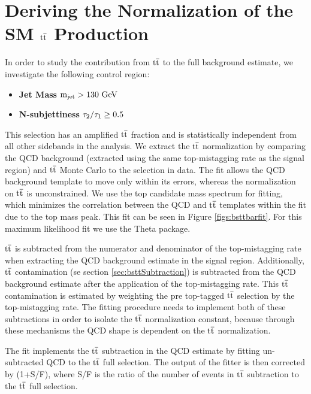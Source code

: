 \section{Deriving the Normalization of the SM $\mathrm{t\overline{t}}$ Production}
\label{sec:bsttbarsideband}
In order to study the contribution from $\mathrm{t\overline{t}}$ to the full background estimate, 
we investigate the following control region:
\begin{itemize}
\item {\bf Jet Mass}   $\mathrm{m_{\text{jet}} > 130~\mathrm{GeV}}$ 
\item {\bf N-subjettiness} $\mathrm{\boldmath \tau_2/\tau_1 \geq 0.5}$ 
\end{itemize}
This selection has an amplified $\mathrm{t\overline{t}}$ fraction and is statistically independent from all other sidebands in the analysis.    
We extract the $\mathrm{t\overline{t}}$ normalization by comparing the QCD background (extracted using the same top-mistagging rate as the signal region) and $\mathrm{t\overline{t}}$ Monte Carlo to the selection in data.
The fit allows the QCD background template to move only within its errors, whereas the normalization on $\mathrm{t\overline{t}}$ is unconstrained. 
We use the top candidate mass spectrum for fitting, which minimizes the correlation between the 
QCD and $\mathrm{t\overline{t}}$ templates within the fit due to the top mass peak. This fit can be seen in Figure \ref{figs:bsttbarfit}.  For this maximum likelihood fit we use the Theta package.

$\mathrm{t\overline{t}}$ is subtracted from the numerator and denominator of the top-mistagging rate when extracting the QCD background estimate in the signal region.  
Additionally, $\mathrm{t\overline{t}}$ contamination (se section \ref{sec:bsttSubtraction}) is subtracted from the QCD background estimate after the application of the top-mistagging rate.  
This $\mathrm{t\overline{t}}$ contamination is estimated by weighting the pre top-tagged $\mathrm{t\overline{t}}$ selection by the top-mistagging rate.  The fitting procedure needs to implement both of these subtractions 
in order to isolate the $\mathrm{t\overline{t}}$ normalization constant, because through these mechanisms the QCD shape is dependent on the $\mathrm{t\overline{t}}$ normalization.

The fit implements the $\mathrm{t\overline{t}}$ subtraction in the QCD estimate by fitting un-subtracted QCD to the $\mathrm{t\overline{t}}$ full selection.  
The output of the fitter is then corrected by  
(1+S/F), where S/F is the ratio of the number of events in $\mathrm{t\overline{t}}$ subtraction to the $\mathrm{t\overline{t}}$ full selection. 

